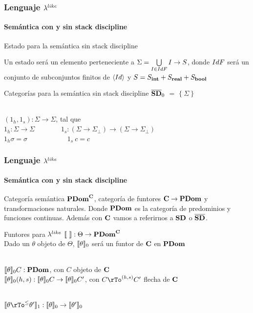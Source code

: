 \documentclass{beamer}
\begin{document}
\begin{frame}
\frametitle{Lenguaje $\lambda^{like}$}
\framesubtitle{Semántica con y sin stack discipline}

\begin{block}{Estado para la semántica sin stack discipline}

Un estado ser\'a un elemento perteneciente a 
$\Sigma = \bigcup\limits_{I \in IdF} I \rightarrow S$, 
donde $IdF$ ser\'a un conjunto de subconjuntos finitos de $\langle Id \rangle$ y
$S = S_{\textbf{int}} + S_{\textbf{real}} + S_{\textbf{bool}}$\\

\end{block}

\pause

\begin{block}{Categorías para la semántica sin stack discipline}
$\overline{\textbf{SD}}_0$ $=$ $\{\ \Sigma \ \}$\\

\

$(1_h,1_s) : \Sigma \rightarrow \Sigma$, tal que\\

$1_h : \Sigma \rightarrow \Sigma$ \ \ \ \ \ \ \
$1_s: (\Sigma \rightarrow \Sigma_{\bot}) \rightarrow (\Sigma \rightarrow \Sigma_{\bot})$\\
\indent
$1_h \sigma = \sigma$ \ \ \ \ \ \ \ \ \ \ \ $1_s \ c = c$

\end{block}

\end{frame}

\begin{frame}
\frametitle{Lenguaje $\lambda^{like}$}
\framesubtitle{Semántica con y sin stack discipline}

\begin{block}{Categoría semántica}
$\textbf{PDom}^{\textbf{C}}$, categoría de funtores $\textbf{C} \rightarrow \textbf{PDom}$ y transformaciones naturales.
Donde $\textbf{PDom}$ es la categoría de predominios y funciones continuas. Además con $\textbf{C}$ vamos a
referirnos a $\textbf{SD}$ o $\overline{\textbf{SD}}$.
\end{block}

\pause

\begin{block}{Funtores para $\lambda^{like}$}
$\llbracket  \  \rrbracket : \Theta \rightarrow \textbf{PDom}^{\textbf{C}}$\\
\pause
Dado un $\theta$ objeto de $\Theta$, $\llbracket \theta \rrbracket_{0}$ será un funtor 
de $\textbf{C}$ en $\textbf{PDom}$\\
\

\pause
$\llbracket \theta \rrbracket_{0}C : \textbf{PDom}$, con $C$ objeto de $\textbf{C}$\\
\pause
$\llbracket \theta \rrbracket_{0}(h,s) : \llbracket \theta \rrbracket_{0}C \rightarrow \llbracket \theta \rrbracket_{0}C'$, con 
$C \rTo^{(h,s)} C'$ flecha de $\textbf{C}$\\

\

$\semBrcks{\theta \rTo^{\leq} \theta'}_{1} : 
	\semBrcks{\theta}_{0} \rightarrow \semBrcks{\theta'}_{0}$\\

\end{block}

\end{frame}
\end{document}

